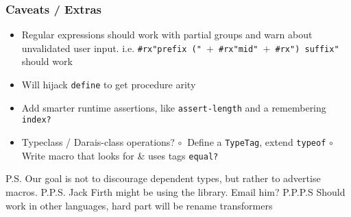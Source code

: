 \documentclass{article}
\begin{document}
\subsubsection*{Caveats / Extras}
\begin{itemize}
  \item Regular expressions should work with partial groups and warn about unvalidated user input.
  \subitem  i.e. \texttt{\#rx"prefix (" $+$ \#rx"mid" $+$ \#rx") suffix"} should work
  \item {Will hijack \texttt{define} to get procedure arity}
  \item {Add smarter runtime assertions, like \texttt{assert-length} and a remembering \texttt{index?}}
  \item Typeclass / Darais-class operations?
  \subitem $\circ~$ Define a {\tt TypeTag}, extend \texttt{typeof}
  \subitem $\circ~$ Write macro that looks for \& uses tags {\tt equal?}
\end{itemize}

P.S. Our goal is not to discourage dependent types, but rather to advertise macros.
P.P.S. Jack Firth might be using the library. Email him?
P.P.P.S Should work in other languages, hard part will be rename transformers
\end{document}

